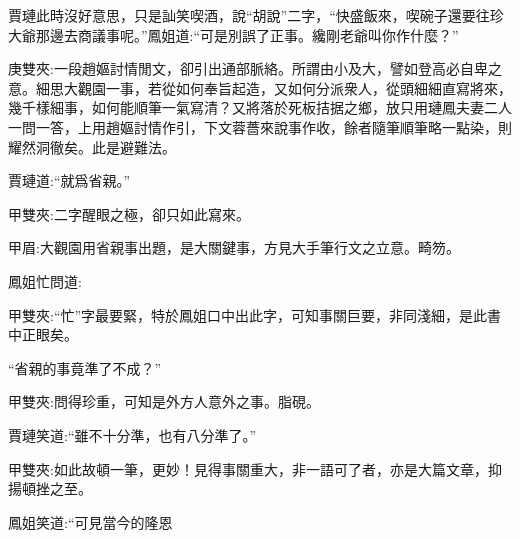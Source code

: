 \begin{parag}
    賈璉此時沒好意思，只是訕笑喫酒，說“胡說”二字，“快盛飯來，喫碗子還要往珍大爺那邊去商議事呢。”鳳姐道:“可是別誤了正事。纔剛老爺叫你作什麼？”\begin{note}庚雙夾:一段趙嫗討情閒文，卻引出通部脈絡。所謂由小及大，譬如登高必自卑之意。細思大觀園一事，若從如何奉旨起造，又如何分派衆人，從頭細細直寫將來，幾千樣細事，如何能順筆一氣寫清？又將落於死板拮据之鄉，放只用璉鳳夫妻二人一問一答，上用趙嫗討情作引，下文蓉薔來說事作收，餘者隨筆順筆略一點染，則耀然洞徹矣。此是避難法。\end{note}賈璉道:“就爲省親。”\begin{note}甲雙夾:二字醒眼之極，卻只如此寫來。\end{note}\begin{note}甲眉:大觀園用省親事出題，是大關鍵事，方見大手筆行文之立意。畸笏。\end{note}鳳姐忙問道:\begin{note}甲雙夾:“忙”字最要緊，特於鳳姐口中出此字，可知事關巨要，非同淺細，是此書中正眼矣。\end{note}“省親的事竟準了不成？”\begin{note}甲雙夾:問得珍重，可知是外方人意外之事。脂硯。\end{note}賈璉笑道:“雖不十分準，也有八分準了。”\begin{note}甲雙夾:如此故頓一筆，更妙！見得事關重大，非一語可了者，亦是大篇文章，抑揚頓挫之至。\end{note}鳳姐笑道:“可見當今的隆恩
\end{parag}
